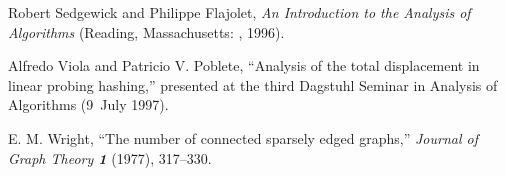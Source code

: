 \smallskip
\bib
[\SF]
Robert Sedgewick and Philippe Flajolet, {\sl An Introduction to the Analysis
of Algorithms\/}  (Reading, Massachusetts: \AW, 1996).

\smallskip
\bib
[\VP]
Alfredo Viola and Patricio V. Poblete, ``Analysis of the total displacement
in linear probing hashing,'' presented at the third Dagstuhl Seminar in
Analysis of Algorithms (9~July 1997).

\smallskip
\bib
[\Wr]
E. M. Wright, ``The number of connected sparsely edged graphs,'' {\sl
Journal of Graph Theory\/ \bf 1} (1977), 317--330.

\bye
